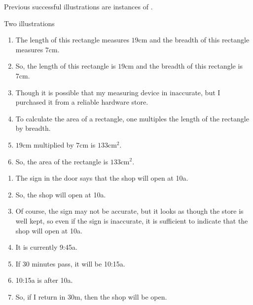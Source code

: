 \begin{note}
  Previous successful illustrations are instances of \USE{}.
\end{note}

\begin{note}
  Two illustrations
\end{note}

\begin{note}
  \begin{illustration}
    \label{ill:rectangle:basic}
    \mbox{}
    \vspace{-\baselineskip}
    \begin{enumerate}
    \item The length of this rectangle measures \(19\text{cm}\) and the breadth of this rectangle measures \(7\text{cm}\).
    \item So, the length of this rectangle is \(19\text{cm}\) and the breadth of this rectangle is \(7\text{cm}\).
    \item\label{ill:rectangle:basic:reasoning} Though it is possible that my measuring device in inaccurate, but I purchased it from a reliable hardware store.
    \item To calculate the area of a rectangle, one multiples the length of the rectangle by breadth.
    \item\label{ill:rectangle:basic:reasoning} \(19\text{cm}\) multiplied by \(7\text{cm}\) is \(133\text{cm}^{2}\).
    \item So, the area of the rectangle is \(133\text{cm}^{2}\).
    \end{enumerate}
    \vspace{-\baselineskip}
  \end{illustration}
\end{note}

\begin{note}
  \begin{illustration}
    \label{ill:waiting-for-shop}
    \mbox{}
    \vspace{-\baselineskip}
    \begin{enumerate}
    \item The sign in the door says that the shop will open at 10a.
    \item So, the shop will open at 10a.
    \item\label{ill:waiting-for-shop:reasoning} Of course, the sign may not be accurate, but it looks as though the store is well kept, so even if the sign is inaccurate, it is sufficient to indicate that the shop will open at 10a.
    \item\label{ill:waiting-for-shop:current-time} It is currently 9:45a.
    \item If 30 minutes pass, it will be 10:15a.
    \item 10:15a is after 10a.
    \item\label{ill:waiting-for-shop:return} So, if I return in 30m, then the shop will be open.
    \end{enumerate}
    \vspace{-\baselineskip}
  \end{illustration}
\end{note}

